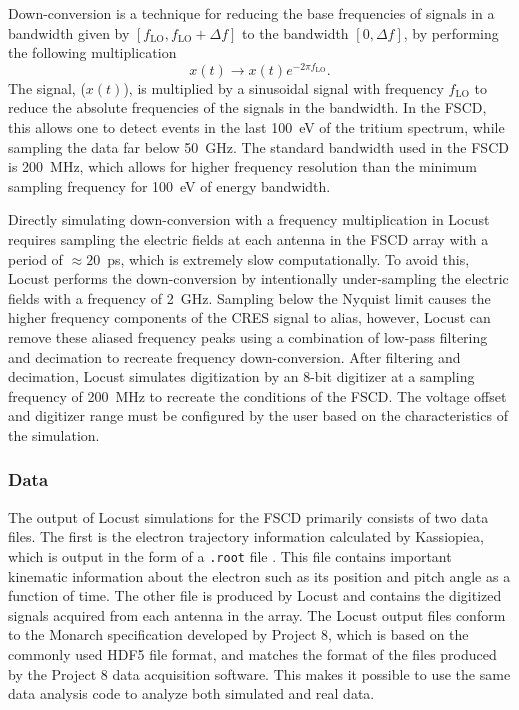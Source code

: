 Down-conversion is a technique for reducing the base frequencies of signals in a bandwidth given by $[f_\textrm{LO},f_\textrm{LO}+\Delta f]$ to the bandwidth $[0, \Delta f]$, by performing the following multiplication
\begin{equation}
    x(t)\rightarrow x(t)e^{-2\pi f_\textrm{LO}}.
\end{equation}
The signal, ($x(t)$), is multiplied by a sinusoidal signal with frequency $f_\textrm{LO}$ to reduce the absolute frequencies of the signals in the bandwidth. In the FSCD, this allows one to detect events in the last 100~eV of the tritium spectrum, while sampling the data far below 50~GHz. The standard bandwidth used in the FSCD is 200~MHz, which allows for higher frequency resolution than the minimum sampling frequency for 100~eV of energy bandwidth.

Directly simulating down-conversion with a frequency multiplication in Locust requires sampling the electric fields at each antenna in the FSCD array with a period of $\approx20$~ps, which is extremely slow computationally. To avoid this, Locust performs the down-conversion by intentionally under-sampling the electric fields with a frequency of 2~GHz. Sampling below the Nyquist limit causes the higher frequency components of the CRES signal to alias, however, Locust can remove these aliased frequency peaks using a combination of low-pass filtering and decimation to recreate frequency down-conversion. After filtering and decimation, Locust simulates digitization by an 8-bit digitizer at a sampling frequency of 200~MHz to recreate the conditions of the FSCD. The voltage offset and digitizer range must be configured by the user based on the characteristics of the simulation. 

\subsubsection*{Data}

The output of Locust simulations for the FSCD primarily consists of two data files. The first is the electron trajectory information calculated by Kassiopiea, which is output in the form of a \texttt{.root} file \cite{root}. This file contains important kinematic information about the electron such as its position and pitch angle as a function of time. The other file is produced by Locust and contains the digitized signals acquired from each antenna in the array. The Locust output files conform to the Monarch specification developed by Project 8, which is based on the commonly used HDF5 file format, and matches the format of the files produced by the Project 8 data acquisition software. This makes it possible to use the same data analysis code to analyze both simulated and real data.

